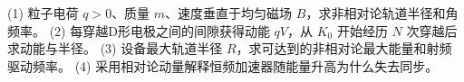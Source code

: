 (1) 粒子电荷 \(q>0\)、质量 \(m\)、速度垂直于均匀磁场 \(B\)，求非相对论轨道半径和角频率。
(2) 每穿越D形电极之间的间隙获得动能 \(qV\)，从 \(K_0\) 开始经历 \(N\) 次穿越后求动能与半径。
(3) 设备最大轨道半径 \(R\)，求可达到的非相对论最大能量和射频驱动频率。
(4) 采用相对论动量解释恒频加速器随能量升高为什么失去同步。
